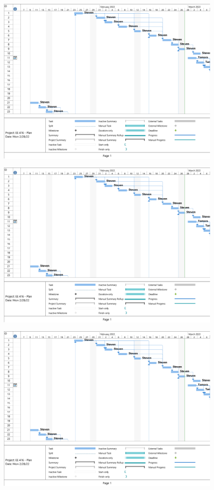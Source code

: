 \documentclass[11pt,letterpaper,conference]{IEEEtran}
\begin{document}
\begin{figure}[th]
    \centering
    \includegraphics[width=\textwidth, page=1]{ext/gantt.pdf}
\end{figure}
\begin{figure}[th]
    \centering
    \includegraphics[width=\textwidth, page=2]{ext/gantt.pdf}
\end{figure}
\begin{figure}[th]
    \centering
    \includegraphics[width=\textwidth, page=3]{ext/gantt.pdf}
\end{figure}
\end{document}
